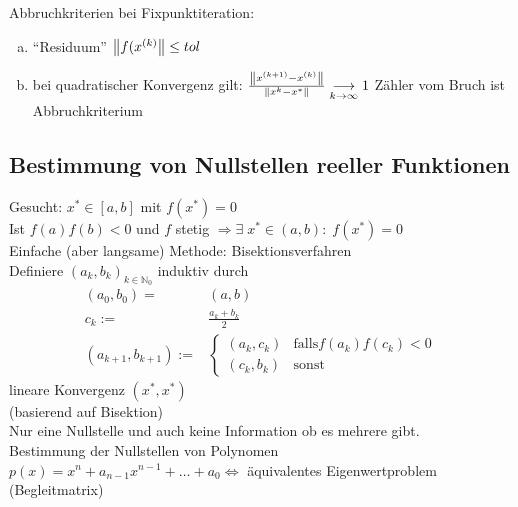 Abbruchkriterien bei Fixpunktiteration:
\begin{enumerate}[a)]
  \item ``Residuum'' $\left\lVert f(x^{(k)} \right\rVert \leq tol$
  \item bei quadratischer Konvergenz gilt: $\frac{\left\lVert x^{(k+1)} - x^{(k)} \right\rVert}{\left\lVert x^k - x^* \right\rVert} \underset{k \rightarrow \infty}{\longrightarrow} 1$
    Zähler vom Bruch ist Abbruchkriterium
\end{enumerate}

\subsection{Bestimmung von Nullstellen reeller Funktionen}
Gesucht: $x^* \in [a,b]$ mit $f(x^*) = 0$\\
Ist $f(a)f(b) < 0$ und $f$ stetig
$\Rightarrow \exists\; x^* \in (a,b):\;f(x^*) = 0$\\
Einfache (aber langsame) Methode: Bisektionsverfahren\\
Definiere $(a_k, b_k)_{k \in \mathbb{N}_0}$ induktiv durch
\begin{align*}
  (a_0, b_0) =& (a, b)\\
  c_k :=& \frac{a_k + b_k}{2}\\
  (a_{k+1}, b_{k+1}) :=& \begin{cases}
    (a_k, c_k) &\mbox{falls} f(a_k)f(c_k) < 0\\
    (c_k, b_k) &\mbox{sonst}
  \end{cases}
\end{align*}
lineare Konvergenz $(x^*, x^*)$\\
 (basierend auf Bisektion)\\
Nur eine Nullstelle und auch keine Information ob es mehrere gibt.\\

Bestimmung der Nullstellen von Polynomen\\
$p(x) = x^n + a_{n-1}x^{n-1} + \ldots + a_0 \Leftrightarrow$ äquivalentes Eigenwertproblem (Begleitmatrix)

